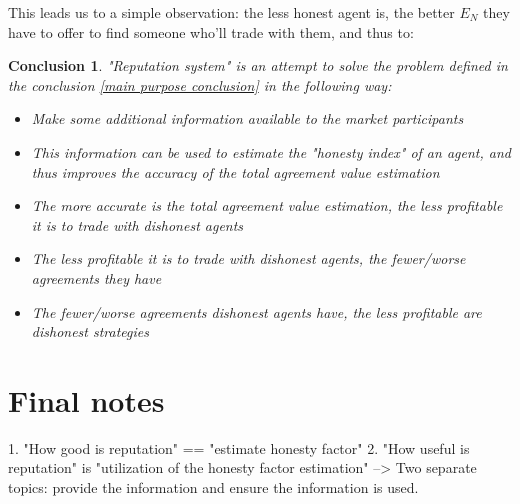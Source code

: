 \documentclass{article}
\newtheorem{conclusion}{Conclusion}[section]
\begin{document}
This leads us to a simple observation: the less honest agent is, the better $E_N$ they have to offer to find someone who'll trade with them, and thus to:

\begin{conclusion}

"Reputation system" is an attempt to solve the problem defined in the conclusion \ref{main purpose conclusion} in the following way:

\begin{itemize}
    \item{Make some additional information available to the market participants}
    \item{This information can be used to estimate the "honesty index" of an agent, and thus improves the accuracy of the total agreement value estimation}
    \item{The more accurate is the total agreement value estimation, the less profitable it is to trade with dishonest agents}
    \item{The less profitable it is to trade with dishonest agents, the fewer/worse agreements they have}
    \item{The fewer/worse agreements dishonest agents have, the less profitable are dishonest strategies}
\end{itemize}

\end{conclusion}


\section{Final notes}

1. "How good is reputation" == "estimate honesty factor"
2. "How useful is reputation" is "utilization of the honesty factor estimation"
--> Two separate topics: provide the information and ensure the information is used.
\end{document}
